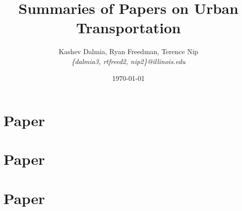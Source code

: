 \documentclass[a4paper]{article}
\title{Summaries of Papers on Urban Transportation}
\author{Kashev Dalmia, Ryan Freedman, Terence Nip \\
        \textit{\{dalmia3, rtfreed2, nip2\}@illinois.edu}
       }
\date{\today}
\begin{document}
\maketitle

\section{Paper}
\section{Paper}
\section{Paper}
\end{document}
